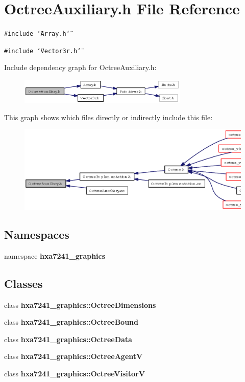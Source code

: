 \section{Octree\-Auxiliary.h File Reference}
\label{OctreeAuxiliary_8h}
{\tt \#include \char`\"{}Array.h\char`\"{}}\par
{\tt \#include \char`\"{}Vector3r.h\char`\"{}}\par


Include dependency graph for Octree\-Auxiliary.h:\begin{figure}[H]
\begin{center}
\leavevmode
\includegraphics[width=228pt]{OctreeAuxiliary_8h__incl}
\end{center}
\end{figure}


This graph shows which files directly or indirectly include this file:\begin{figure}[H]
\begin{center}
\leavevmode
\includegraphics[width=349pt]{OctreeAuxiliary_8h__dep__incl}
\end{center}
\end{figure}
\subsection*{Namespaces}
\begin{CompactItemize}
\item 
namespace {\bf hxa7241\_\-graphics}
\end{CompactItemize}
\subsection*{Classes}
\begin{CompactItemize}
\item 
class {\bf hxa7241\_\-graphics::Octree\-Dimensions}
\item 
class {\bf hxa7241\_\-graphics::Octree\-Bound}
\item 
class {\bf hxa7241\_\-graphics::Octree\-Data}
\item 
class {\bf hxa7241\_\-graphics::Octree\-Agent\-V}
\item 
class {\bf hxa7241\_\-graphics::Octree\-Visitor\-V}
\end{CompactItemize}
